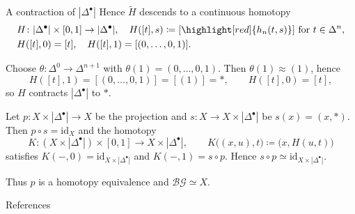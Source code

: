 \documentclass[aspectratio=169]{beamer}
\newcommand{\G}{\mathcal{G}}
\begin{document}
\begin{frame}{A contraction of $|\Delta^\bullet|$}
Hence $\widetilde H$ descends to a continuous homotopy
\[
\begin{aligned}
&H\colon |\Delta^\bullet|\times[0,1]\to |\Delta^\bullet|, \quad H([t],s)\coloneqq [\highlight[red]{h_n(t,s)}] \text{ for } t\in\Delta^n, \\
&H([t],0)=[t], \quad H([t],1)=[(0,\dots,0,1)].
\end{aligned}
\]

Choose $\theta:\Delta^0\to\Delta^{n+1}$ with $\theta(1)=(0,\dots,0,1)$.
Then $\theta(1)\approx (1)$, hence
\[
H([t],1)=[(0,\dots,0,1)]=[(1)]=\ast,
\qquad
H([t],0)=[t],
\]
so $H$ contracts $|\Delta^\bullet|$ to $\ast$.

Let $p\colon X\times|\Delta^\bullet|\to X$ be the projection and $s\colon X\to X\times|\Delta^\bullet|$ be $s(x)=(x,\ast)$.
Then $p\circ s=\mathrm{id}_X$ and the homotopy
\[
K\colon (X\times|\Delta^\bullet|)\times[0,1]\to X\times|\Delta^\bullet|,
\qquad
K\bigl((x,u),t\bigr)\coloneqq \bigl(x,H(u,t)\bigr)
\]
satisfies $K(-,0)=\mathrm{id}_{X\times|\Delta^\bullet|}$ and $K(-,1)=s\circ p$.
Hence $s\circ p\simeq \mathrm{id}_{X\times|\Delta^\bullet|}$.

Thus $p$ is a homotopy equivalence and $\mathcal B{\G}\simeq X$.
\end{frame}

\begin{frame}{References}
  \printbibliography
  \nocite{*}
\end{frame}
\end{document}
